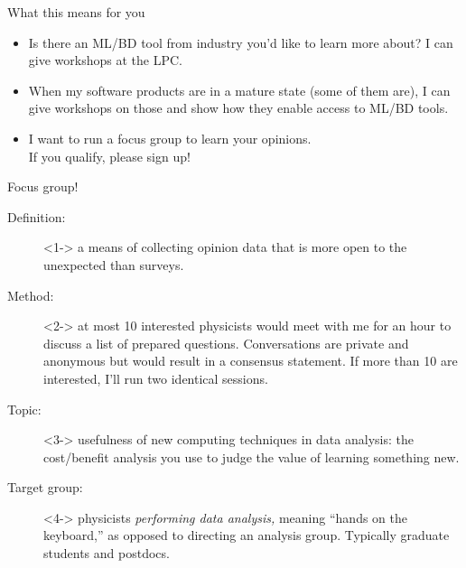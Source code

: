 \documentclass{beamer}
\begin{document}
\begin{frame}{What this means for you}
\begin{itemize}\setlength{\itemsep}{0.5 cm}
\item Is there an ML/BD tool from industry you'd like to learn more about? I can give workshops at the LPC.
\item When my software products are in a mature state (some of them are), I can give workshops on those and show how they enable access to ML/BD tools.
\item I want to run a focus group to learn your opinions. \\ If you qualify, please sign up!
\end{itemize}
\end{frame}

\begin{frame}{Focus group!}
\vspace{0.25 cm}
\begin{description}
\item[Definition:]<1-> a means of collecting opinion data that is more open to the unexpected than surveys.
\item[Method:]<2-> at most 10 interested physicists would meet with me for an hour to discuss a list of prepared questions. Conversations are private and anonymous but would result in a consensus statement. If more than 10 are interested, I'll run two identical sessions.
\item[Topic:]<3-> usefulness of new computing techniques in data analysis: the cost/benefit analysis you use to judge the value of learning something new.
\item[Target group:]<4-> physicists {\it performing data analysis,} meaning ``hands on the keyboard,'' as opposed to directing an analysis group. Typically graduate students and postdocs.
\end{description}

\end{frame}
\end{document}
